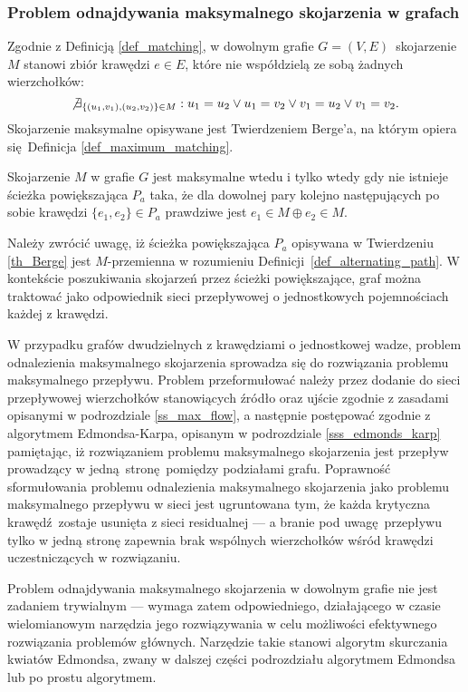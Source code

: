 \subsubsection{\textbf{Problem odnajdywania maksymalnego skojarzenia w grafach}}
\par{
  Zgodnie z Definicją \ref{def_matching}, w dowolnym grafie $G=(V,E)$~skojarzenie $M$ stanowi zbiór krawędzi $e \in E$, które nie współdzielą ze sobą żadnych wierzchołków: \[\not\exists_{\{(u_1,v_1), (u_2, v_2)\} \in M}:{u_1 = u_2 \lor u_1 = v_2 \lor v_1 = u_2 \lor v_1 = v_2}.\]
  Skojarzenie maksymalne opisywane jest Twierdzeniem Berge'a, na którym opiera się Definicja \ref{def_maximum_matching}.
  \begin{theorem}
    Skojarzenie $M$ w grafie $G$ jest maksymalne wtedu i tylko wtedy gdy nie istnieje ścieżka powiększająca $P_a$ taka, że dla dowolnej pary kolejno następujących po sobie krawędzi $\{e_1, e_2\} \in P_a$ prawdziwe jest $e_1 \in M \oplus e_2 \in M$.
  \end{theorem}
   Należy zwrócić uwagę, iż ścieżka powiększająca $P_a$ opisywana w Twierdzeniu \ref{th_Berge} jest $M$-przemienna w rozumieniu Definicji~\ref{def_alternating_path}.
   W kontekście poszukiwania skojarzeń przez ścieżki powiększające, graf można traktować jako odpowiednik sieci przepływowej o jednostkowych pojemnościach każdej z krawędzi.
}
\par{
  W przypadku grafów dwudzielnych z krawędziami o jednostkowej wadze, problem odnalezienia maksymalnego skojarzenia sprowadza się do rozwiązania problemu maksymalnego przepływu.
  Problem przeformułować należy przez dodanie do sieci przepływowej wierzchołków stanowiących źródło oraz ujście zgodnie z zasadami opisanymi w podrozdziale \ref{ss_max_flow}, a następnie postępować zgodnie z algorytmem Edmondsa-Karpa, opisanym w podrozdziale \ref{sss_edmonds_karp} pamiętając, iż rozwiązaniem problemu maksymalnego skojarzenia jest przepływ prowadzący w jedną stronę pomiędzy podziałami grafu.
  Poprawność sformułowania problemu odnalezienia maksymalnego skojarzenia jako problemu maksymalnego przepływu w sieci jest ugruntowana tym, że każda krytyczna krawędź zostaje usunięta z sieci residualnej --- a branie pod uwagę przepływu tylko w jedną stronę zapewnia brak wspólnych wierzchołków wśród krawędzi uczestniczących w rozwiązaniu.
}
\par{
  Problem odnajdywania maksymalnego skojarzenia w dowolnym grafie nie jest zadaniem trywialnym --- wymaga zatem odpowiedniego, działającego w czasie wielomianowym narzędzia jego rozwiązywania w celu możliwości efektywnego rozwiązania problemów głównych.
  Narzędzie takie stanowi algorytm skurczania kwiatów Edmondsa, zwany w dalszej części podrozdziału algorytmem Edmondsa lub po prostu algorytmem.
}

